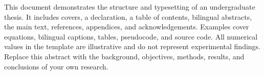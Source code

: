 \begin{abstract}
本文件演示华中农业大学本科毕业论文的基本排版结构，包括封面、扉页、声明、目录、中英文摘要、正文、参考文献、附录和致谢。正文提供公式、双语图题、三线表、跨页表格、伪代码和代码清单示例，便于初次使用 LaTeX 的同学在可编译的工程上逐步替换内容。示例中的数据仅用于展示排版，不代表真实实验结果。正式摘要应概述研究背景、目的、方法、主要结果和结论，并与英文摘要相对应。
\end{abstract}
\begin{abstractEN}
This document demonstrates the structure and typesetting of an undergraduate thesis. It includes covers, a declaration, a table of contents, bilingual abstracts, the main text, references, appendices, and acknowledgements. Examples cover equations, bilingual captions, tables, pseudocode, and source code. All numerical values in the template are illustrative and do not represent experimental findings. Replace this abstract with the background, objectives, methods, results, and conclusions of your own research.
\end{abstractEN}
